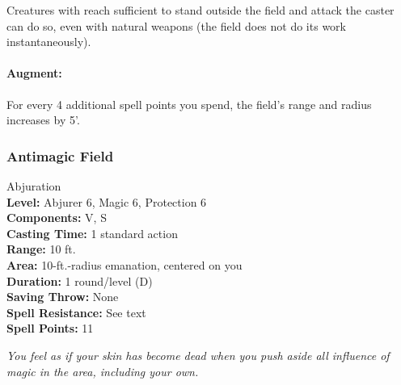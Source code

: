 Creatures with reach sufficient to stand outside the field and attack the caster can do so, even with natural weapons (the field does not do its work instantaneously).

\paragraph{Augment:} For every 4 additional spell points you spend, the field's range and radius increases by 5'.
\subsubsection{Antimagic Field}
\label{Spell:AntimagicField}
Abjuration
\\ \textbf{Level:} Abjurer 6, Magic 6, Protection 6
\\ \textbf{Components:} V, S
\\ \textbf{Casting Time:} 1 standard action
\\ \textbf{Range:} 10 ft.
\\ \textbf{Area:} 10-ft.-radius emanation, centered on you
\\ \textbf{Duration:} 1 round/level (D)
\\ \textbf{Saving Throw:} None
\\ \textbf{Spell Resistance:} See text
\\ \textbf{Spell Points:} 11

\emph{You feel as if your skin has become dead when you push aside all influence of magic in the area, including your own.}

